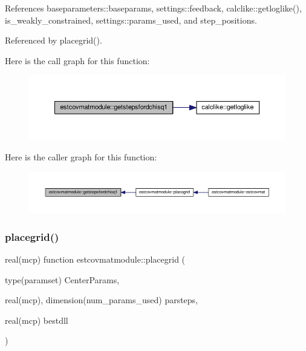 References baseparameters\+::baseparams, settings\+::feedback, calclike\+::getloglike(), is\+\_\+weakly\+\_\+constrained, settings\+::params\+\_\+used, and step\+\_\+positions.



Referenced by placegrid().

Here is the call graph for this function\+:
\nopagebreak
\begin{figure}[H]
\begin{center}
\leavevmode
\includegraphics[width=350pt]{namespaceestcovmatmodule_ac80cbfe7c3c7ed84526e57a069e41ccf_cgraph}
\end{center}
\end{figure}
Here is the caller graph for this function\+:
\nopagebreak
\begin{figure}[H]
\begin{center}
\leavevmode
\includegraphics[width=350pt]{namespaceestcovmatmodule_ac80cbfe7c3c7ed84526e57a069e41ccf_icgraph}
\end{center}
\end{figure}
\mbox{\label{namespaceestcovmatmodule_a2bc770f26c02a798aaf3ff8f2cc274aa}} 
\subsubsection{\texorpdfstring{placegrid()}{placegrid()}}
{\footnotesize\ttfamily real(mcp) function estcovmatmodule\+::placegrid (\begin{DoxyParamCaption}\item[{type(paramset)}]{Center\+Params,  }\item[{real(mcp), dimension(num\+\_\+params\+\_\+used)}]{parsteps,  }\item[{real(mcp)}]{bestdll }\end{DoxyParamCaption})}




